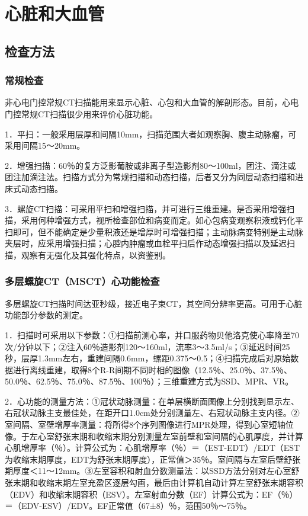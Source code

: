 \chapter{心脏和大血管}

\section{检查方法}

\subsection{常规检查}

非心电门控常规CT扫描能用来显示心脏、心包和大血管的解剖形态。目前，心电门控常规CT扫描很少用来评价心脏功能。

1．平扫：一般采用层厚和间隔10mm，扫描范围大者如观察胸、腹主动脉瘤，可采用间隔15～20mm。

2．增强扫描：60％的复方泛影葡胺或非离子型造影剂80～100ml，团注、滴注或团注加滴注法。扫描方式分为常规扫描和动态扫描，后者又分为同层动态扫描和进床式动态扫描。

3．螺旋CT扫描：可采用平扫和增强扫描，并可进行三维重建。是否采用增强扫描，采用何种增强方式，视所检查部位和病变而定。如心包病变观察积液或钙化平扫即可，但不能确定是少量积液还是增厚时可增强扫描；主动脉病变特别是主动脉夹层时，应采用增强扫描；心腔内肿瘤或血栓平扫后作动态增强扫描以及延迟扫描，观察有无强化及其强化特点，以资鉴别。

\subsection{多层螺旋CT（MSCT）心功能检查}

多层螺旋CT扫描时间达亚秒级，接近电子束CT，其空间分辨率更高。可用于心脏功能部分参数的测定。

1．扫描时可采用以下参数：①扫描前测心率，并口服药物贝他洛克使心率降至70次/分钟以下；②注入60％造影剂120～160ml，流率3～3.5ml/s；③延迟时间25秒，层厚1.3mm左右，重建间隔0.6mm，螺距0.375～0.5；④扫描完成后对原始数据进行离线重建，取得8个R-R间期不同时相的图像（12.5％、25.0％、37.5％、50.0％、62.5％、75.0％、87.5％、100％）；三维重建方式为SSD、MPR、VR。

2．心功能的测量方法：①冠状动脉测量：在单层横断面图像上分别找到显示左、右冠状动脉主支最佳处，在距开口1.0cm处分别测量左、右冠状动脉主支内径。②室间隔、室壁增厚率测量：将所得8个序列图像进行MPR处理，得到心室短轴位像。于左心室舒张末期和收缩末期分别测量左室前壁和室间隔的心肌厚度，并计算心肌增厚率（％）。计算公式为：心肌增厚率（％）＝（EST-EDT）/EDT（EST为收缩末期厚度，EDT为舒张末期厚度），正常值＞35％。室间隔与左室后壁舒张期厚度＜11～12mm。③左室容积和射血分数测量法：以SSD方法分别对左心室舒张末期和收缩末期左室充盈区逐层勾画，最后由计算机自动计算左室舒张末期容积（EDV）和收缩末期容积（ESV）。左室射血分数（EF）计算公式为：EF（％）＝（EDV-ESV）/EDV。EF正常值（67±8）％，范围50％～75％。

